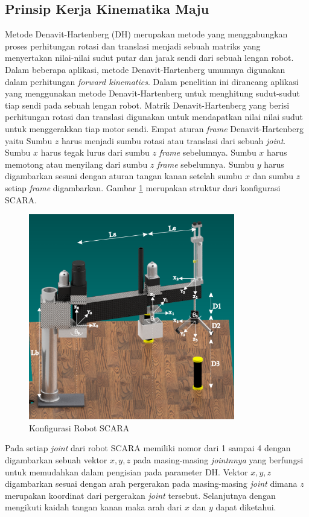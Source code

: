 \subsection{Prinsip Kerja Kinematika Maju}
Metode Denavit-Hartenberg (DH) merupakan metode yang menggabungkan proses perhitungan rotasi dan translasi menjadi sebuah matriks yang menyertakan nilai-nilai sudut putar dan jarak sendi dari sebuah lengan robot. Dalam beberapa aplikasi, metode Denavit-Hartenberg umumnya digunakan dalam perhitungan \textit{forward kinematics}. Dalam penelitian ini dirancang aplikasi yang menggunakan metode Denavit-Hartenberg untuk menghitung sudut-sudut tiap sendi pada sebuah lengan robot. Matrik Denavit-Hartenberg yang berisi perhitungan rotasi dan translasi digunakan untuk mendapatkan nilai nilai sudut untuk menggerakkan tiap motor sendi. Empat aturan \textit{frame} Denavit-Hartenberg yaitu Sumbu $z$ harus menjadi sumbu rotasi atau translasi dari sebuah \textit{joint}. Sumbu $x$ harus tegak lurus dari sumbu $z$ \textit{frame} sebelumnya. Sumbu $x$ harus memotong atau menyilang dari sumbu $z$ \textit{frame} sebelumnya. Sumbu $y$ harus digambarkan sesuai dengan aturan tangan kanan setelah sumbu $x$   dan sumbu $z$ setiap \textit{frame} digambarkan. Gambar \ref{dhscara} merupakan struktur dari konfigurasi SCARA.
\begin{figure}[H]
	\centering
	\includegraphics[width=9cm ]{gambar/scaradh.png}
	\caption{Konfigurasi Robot SCARA}
	\label{dhscara}
\end{figure}
Pada setiap \textit{joint} dari robot SCARA memiliki nomor dari 1 sampai 4 dengan digambarkan sebuah vektor $x, y, z$ pada masing-masing \textit{jointnnya} yang berfungsi untuk memudahkan dalam pengisian pada parameter DH. Vektor $x, y, z$ digambarkan sesuai dengan arah pergerakan pada masing-masing \textit{joint} dimana $z$ merupakan koordinat dari pergerakan \textit{joint} tersebut. Selanjutnya dengan mengikuti kaidah tangan kanan maka arah dari $x$ dan $y$ dapat diketahui. 

